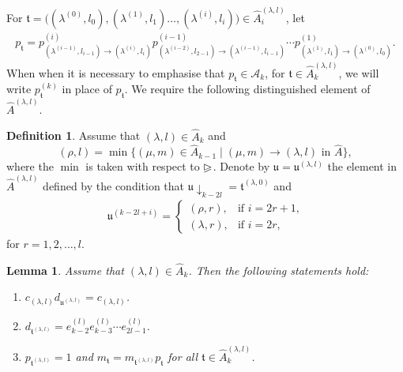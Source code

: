 \documentclass[11pt,a4paper,reqno,svgnames]{amsart}
\theoremstyle{plain}
\newtheorem{lemma}[theorem]{Lemma}
\theoremstyle{definition}
\newtheorem{definition}[theorem]{Definition}
\numberwithin{equation}{section}
\begin{document}
For $\mathfrak{t}=\big( (\lambda^{(0)},l_0),(\lambda^{(1)},l_1)\ldots,(\lambda^{(i)},l_i))\in\hat{A}_{i}^{(\lambda,l)}$, let 
\begin{align*}
p_\mathfrak{t}= p_{(\lambda^{(i-1)},l_{i-1})\to (\lambda^{(i)},l_i)}^{(i)}p_{(\lambda^{(i-2)},l_{2-1})\to (\lambda^{(i-1)},l_{i-1})}^{(i-1)}\cdots p_{(\lambda^{(1)},l_{1})\to (\lambda^{(0)},l_{0})}^{(1)}.
\end{align*}
When when it is necessary to emphasise that $p_\mathfrak{t}\in \mathcal{A}_k$, for $\mathfrak{t}\in\hat{A}_k^{(\lambda,l)}$, we will write $p^{(k)}_\mathfrak{t}$ in place of $p_\mathfrak{t}$. We require the following distinguished element of $\hat{A}^{(\lambda,l)}$. 
\begin{definition}
Assume that $(\lambda,l)\in\hat{A}_k$ and 
\[
(\rho,l) =\min\lbrace(\mu,m)\in \hat{A}_{k-1}\mid (\mu,m)\to (\lambda,l)\text{ in }\hat{A}\rbrace,
\]
where the $\min$ is taken with respect to ${\trianglerighteqslant}$.  Denote by $\mathfrak{u}=\mathfrak{u}^{(\lambda,l)}$ the element in $\hat{A}^{(\lambda,l)}$ defined by the condition that   $\mathfrak{u}\downarrow_{k-2l}=\mathfrak{t}^{(\lambda,0)}$ and 
\begin{align*}
\mathfrak{u}^{(k-2l+i)}=
\begin{cases}
(\rho,r),&\text{if $i=2r+1$,}\\
(\lambda,r),&\text{if $i=2r$,}
\end{cases}
\end{align*}
for $r=1,2,\ldots,l$. 
\end{definition}
\begin{lemma}\label{rewrite}
Assume that $(\lambda,l)\in\hat{A}_k$. Then the following statements hold:
\begin{enumerate}
\item\label{rewrite:1} $c_{(\lambda,l)}d_{\mathfrak{u}^{(\lambda,l)}} =c_{(\lambda,l)}$. 
\item\label{rewrite:1.1}  $d_{\mathfrak{t}^{(\lambda,l)}}=e_{k-2}^{(l)} e_{k-3}^{(l)}\cdots e_{2l-1}^{(l)}$. 
\item\label{rewrite:2} $p_{\mathfrak{t}^{(\lambda,l)}}=1$ and $m_\mathfrak{t}=m_{\mathfrak{t}^{(\lambda,l)}}p_\mathfrak{t}$ for all $\mathfrak{t}\in\hat{A}_k^{(\lambda,l)}$.
\end{enumerate}
\end{lemma}
\end{document}
